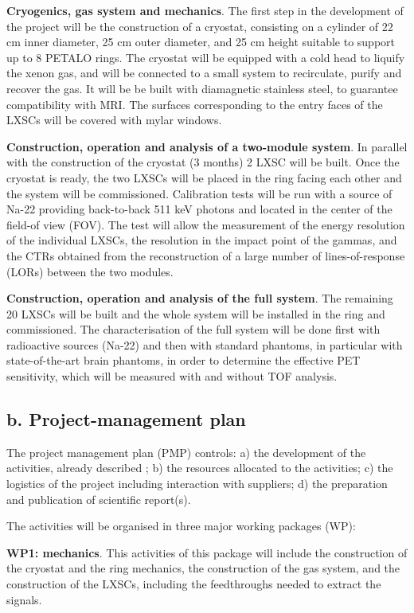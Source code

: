 \documentclass[11pt,a4paper]{article}
\begin{document}
{\bf Cryogenics, gas system and mechanics}.
The first step in the development of the project will be the construction of a cryostat, consisting on a cylinder of 22 cm inner diameter, 25 cm outer diameter, and 25 cm height suitable to support up to 8 PETALO rings.  The cryostat will be equipped with a cold head to liquify the xenon gas, and will be connected to a small system to recirculate, purify and recover the gas. It will be be built with diamagnetic stainless steel, to guarantee compatibility with MRI. The surfaces corresponding to the entry faces of the LXSCs will be covered with mylar windows. 

{\bf Construction, operation and analysis of a two-module system}. In parallel with the construction of the cryostat (3 months) 2 LXSC will be built.  Once the cryostat is ready, the two LXSCs will be placed in the ring facing each other and the system will be commissioned. Calibration tests will be run with a source of Na-22 providing back-to-back 511 keV photons and located in the center of the field-of view (FOV). The test will allow the measurement of the energy resolution of the individual LXSCs, the resolution in the impact point of the gammas, and the CTRs obtained from the reconstruction of a large number of lines-of-response (LORs) between the two modules. 

{\bf Construction, operation and analysis of the full system}. The remaining 20 LXSCs will be built and the whole system will be installed in the ring and commissioned. The characterisation of the full system will be done first with radioactive sources (Na-22) and then with standard phantoms, in particular with state-of-the-art brain phantoms, in order to determine the effective PET sensitivity, which will be measured with and without TOF analysis. 

\subsection*{b. Project-management plan}
The project management plan (PMP) controls: a) the development of the activities, already described ; b) the resources allocated to the activities; c) the logistics of the project including interaction with suppliers; d) the preparation and publication of scientific report(s).

The activities will be organised in three major working packages (WP): 

{\bf WP1: mechanics}. This activities of this package will include the construction of 
the cryostat and the ring mechanics,  the construction of the gas system,  and the construction of the LXSCs, including the feedthroughs needed to extract the signals. 
\end{document}
